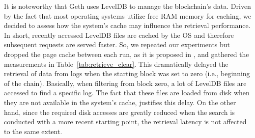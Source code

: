 \begin{table}[H]
\caption{Retrieval latency in Ethereum with clear cache (ms)}
\label{tab:retrieve_clear}
\centering
{}
\end{table}

It is noteworthy that Geth uses LevelDB to manage the blockchain's data. Driven by the fact that most operating systems utilize free RAM memory for caching, we decided to assess how the system’s cache may influence the retrieval performance. In short, recently accessed LevelDB files are cached by the OS and therefore subsequent requests are served faster. So, we repeated our experiments but dropped the page cache between each run, as it is proposed in  \citep{perez_2020}, and gathered the measurements in Table~\ref{tab:retrieve_clear}. This dramatically delayed the retrieval of data from logs when the starting block was set to zero (i.e., beginning of the chain). Basically, when filtering from block zero, a lot of LevelDB files are accessed to find a specific log. The fact that these files are loaded from disk when they are not available in the system’s cache, justifies this delay. On the other hand, since the required disk accesses are greatly reduced when the search is conducted with a more recent starting point, the retrieval latency is not affected to the same extent.



